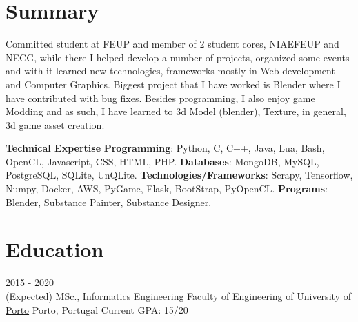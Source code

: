 \documentclass[letterpaper]{twentysecondcv} %
\begin{document}
\makeprofile %


\section{Summary}

Committed student at FEUP and member of 2 student cores, NIAEFEUP and NECG, while there I helped develop a number of projects, organized some events and with it learned new technologies, frameworks mostly in Web development and Computer Graphics. 
Biggest project that I have worked is Blender where I have contributed with bug fixes.
Besides programming, I also enjoy game Modding and as such, I have learned to 3d Model (blender), Texture, in general, 3d game asset creation. \newline
   
\textbf{Technical Expertise} \newline
\textbf{Programming}: Python, C, C++, Java, Lua, Bash, OpenCL, Javascript, CSS, HTML, PHP. \newline
\textbf{Databases}: MongoDB, MySQL, PostgreSQL, SQLite, UnQLite. \newline
\textbf{Technologies/Frameworks}: Scrapy, Tensorflow, Numpy, Docker, AWS, PyGame, Flask, BootStrap, PyOpenCL. \newline
\textbf{Programs}: Blender, Substance Painter, Substance Designer. 


\vspace{3mm}\section{Education}

\begin{twenty} %
	\twentyitem
    	{2015 - 2020 \\ (Expected)}
        {MSc., Informatics Engineering}
        {\href{http://www.uoguelph.ca/}{Faculty of Engineering of University of Porto}}
        {Porto, Portugal}
        {Current GPA: 15/20 \\ }
\end{twenty}


\end{document}
